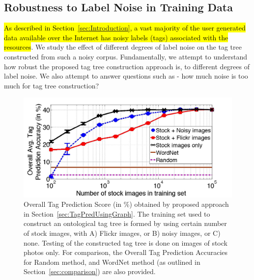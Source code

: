 \subsection{Robustness to Label Noise in Training Data}
\label{sec:RobustNoise}
\hl{As described in Section~{\ref{sec:Introduction}}, a vast majority of the user generated data available over the Internet has noisy labels (tags) associated with the resources}. We study the effect of different degrees of label noise on the tag tree constructed from such a noisy corpus. Fundamentally, we attempt to understand how robust the proposed tag tree construction approach is, to different degrees of label noise. We also attempt to answer questions such as - how much noise is too much for tag tree construction? 
\begin{figure}
\centering
\includegraphics[width=0.65\linewidth]{TagTree/journal_RobustnessFig}
\caption[Robustness analysis using Overall Tag Prediction Score (in \%) obtained by proposed approach in Section~\ref{sec:TagPredUsingGraph}. ]{Overall Tag Prediction Score (in \%) obtained by proposed approach in Section~\ref{sec:TagPredUsingGraph}. The training set used to construct an ontological tag tree is formed by using certain number of stock images, with A) Flickr images, or B) noisy images, or C) none. Testing of the constructed tag tree is done on images of stock photos only. For comparison, the Overall Tag Prediction Accuracies for Random method, and WordNet method (as outlined in Section~\ref{sec:comparison}) are also provided. } 
\label{fig:AddNoiseTrainingData}
\end{figure}

